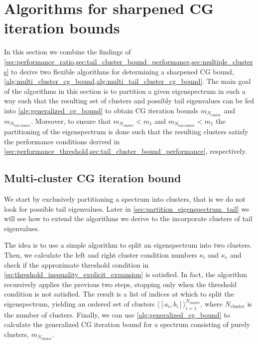 \section{Algorithms for sharpened CG iteration bounds}\label{sec:cg_iteration_bound_algorithm}
In this section we combine the findings of \cref{sec:performance_ratio,sec:tail_cluster_bound_performance,sec:multiple_clusters} to derive two flexible algorithms for determining a sharpened CG bound, \cref{alg:multi_cluster_cg_bound,alg:multi_tail_cluster_cg_bound}. The main goal of the algorithms in this section is to partition a given eigenspectrum in such a way such that the resulting set of clusters and possibly tail eigenvalues can be fed into \cref{alg:generalized_cg_bound} to obtain CG iteration bounds $m_{N_{\text{cluster}}}$ and $m_{N_{\text{tail-cluster}}}$. Moreover, to ensure that $m_{N_{\text{cluster}}} < m_1$ and $m_{N_{\text{tail-cluster}}} < m_1$ the partitioning of the eigenspectrum is done such that the resulting clusters satisfy the performance conditions derived in \cref{sec:performance_threshold,sec:tail_cluster_bound_performance}, respectively.

\subsection{Multi-cluster CG iteration bound}\label{sec:partition_eigenspectrum}
We start by exclusively partitioning a spectrum into clusters, that is we do not look for possible tail eigenvalues. Later in \cref{sec:partition_eigenspectrum_tail} we will see how to extend the algorithms we derive to the incorporate clusters of tail eigenvalues. 

The idea is to use a simple algorithm to split an eigenspectrum into two clusters. Then, we calculate the left and right cluster condition numbers $\kappa_l$ and $\kappa_r$ and check if the approximate threshold condition in \cref{eq:threshold_inequality_explicit_expansion} is satisfied. In fact, the algorithm recursively applies the previous two steps, stopping only when the threshold condition is not satisfied. The result is a list of indices at which to split the eigenspectrum, yielding an ordered set of clusters $\langle[a_i, b_i]\rangle_{i=1}^{N_{\text{cluster}}}$, where $N_{\text{cluster}}$ is the number of clusters. Finally, we can use \cref{alg:generalized_cg_bound} to calculate the generalized CG iteration bound for a spectrum consisting of purely clusters, $m_{N_{\text{cluster}}}$.


